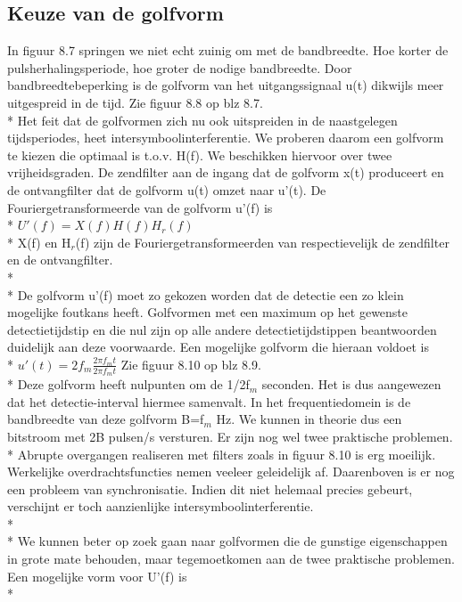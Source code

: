 \documentclass[10pt]{article}
\begin{document}
\subsection{Keuze van de golfvorm}
In figuur 8.7 springen we niet echt zuinig om met de bandbreedte. Hoe korter de pulsherhalingsperiode, hoe groter de nodige bandbreedte. Door bandbreedtebeperking is de golfvorm van het uitgangssignaal u(t) dikwijls meer uitgespreid in de tijd. {\scriptsize Zie figuur 8.8 op blz 8.7.}\\*
Het feit dat de golfvormen zich nu ook uitspreiden in de naastgelegen tijdsperiodes, heet intersymboolinterferentie. We proberen daarom een golfvorm te kiezen die optimaal is t.o.v. H(f). We beschikken hiervoor over twee vrijheidsgraden. De zendfilter aan de ingang dat de golfvorm x(t) produceert en de ontvangfilter dat de golfvorm u(t) omzet naar u'(t).
De Fouriergetransformeerde van de golfvorm u'(f) is\\*
$U'(f) = X(f)H(f)H_r(f)$\\*
{\scriptsize X(f) en H$_r$(f) zijn de Fouriergetransformeerden van respectievelijk de zendfilter en de ontvangfilter.}\\*\\*
De golfvorm u'(f) moet zo gekozen worden dat de detectie een zo klein mogelijke foutkans heeft. Golfvormen met een maximum op het gewenste detectietijdstip en die nul zijn op alle andere detectietijdstippen beantwoorden duidelijk aan deze voorwaarde. Een mogelijke golfvorm die hieraan voldoet is\\*
$u'(t) = 2f_m\frac{2\pi f_mt}{2\pi f_m t}$ {\scriptsize Zie figuur 8.10 op blz 8.9.}\\*
Deze golfvorm heeft nulpunten om de 1/2f$_m$ seconden. Het is dus aangewezen dat het detectie-interval hiermee samenvalt. In het frequentiedomein is de bandbreedte van deze golfvorm B=f$_m$ Hz. We kunnen in theorie dus een bitstroom met 2B pulsen/s versturen. Er zijn nog wel twee praktische problemen.\\*
Abrupte overgangen realiseren met filters zoals in figuur 8.10 is erg moeilijk.  Werkelijke overdrachtsfuncties nemen veeleer geleidelijk af. Daarenboven is er nog een probleem van synchronisatie. Indien dit niet helemaal precies gebeurt, verschijnt er toch aanzienlijke intersymboolinterferentie.\\*\\*
We kunnen beter op zoek gaan naar golfvormen die de gunstige eigenschappen in grote mate behouden, maar tegemoetkomen aan de twee praktische problemen. Een mogelijke vorm voor U'(f) is\\*
\end{document}

